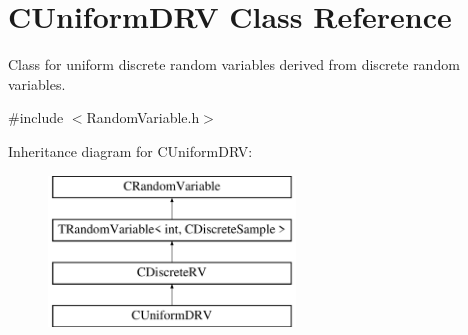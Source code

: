 \hypertarget{class_c_uniform_d_r_v}{\section{C\-Uniform\-D\-R\-V Class Reference}
\label{class_c_uniform_d_r_v}
}


Class for uniform discrete random variables derived from discrete random variables.  




{\ttfamily \#include $<$Random\-Variable.\-h$>$}

Inheritance diagram for C\-Uniform\-D\-R\-V\-:\begin{figure}[H]
\begin{center}
\leavevmode
\includegraphics[height=4.000000cm]{class_c_uniform_d_r_v}
\end{center}
\end{figure}
